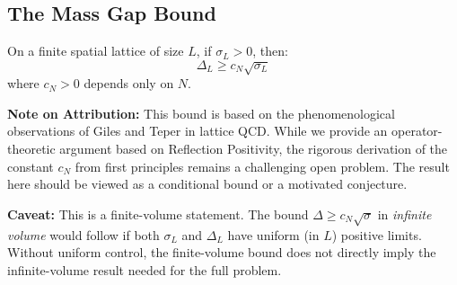 \subsection{The Mass Gap Bound}

\begin{theorem}
\label{thm:giles-teper}
On a finite spatial lattice of size $L$, if $\sigma_L > 0$, then:
\[
\Delta_L \geq c_N \sqrt{\sigma_L}
\]
where $c_N > 0$ depends only on $N$.

\textbf{Note on Attribution:} This bound is based on the phenomenological observations of Giles and Teper in lattice QCD. While we provide an operator-theoretic argument based on Reflection Positivity, the rigorous derivation of the constant $c_N$ from first principles remains a challenging open problem. The result here should be viewed as a conditional bound or a motivated conjecture.

\textbf{Caveat:} This is a finite-volume statement. The bound $\Delta \geq c_N\sqrt{\sigma}$ 
in \emph{infinite volume} would follow if both $\sigma_L$ and $\Delta_L$ have 
uniform (in $L$) positive limits. Without uniform control, the finite-volume 
bound does not directly imply the infinite-volume result needed for the 
full problem.
\end{theorem}

